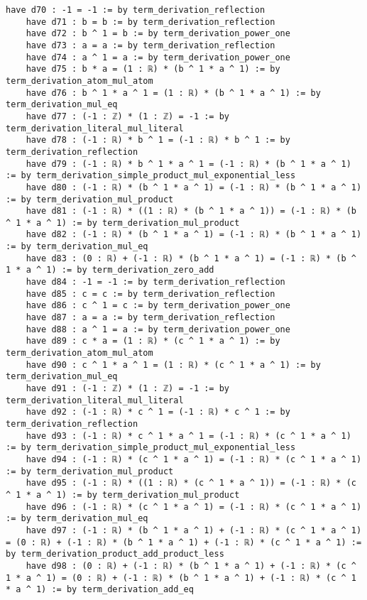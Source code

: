 \documentclass{article}
\begin{document}
\begin{tcolorbox}[colback=white!10, width=\linewidth]
\begin{lstlisting}[language=Lean4]
    have d70 : -1 = -1 := by term_derivation_reflection
    have d71 : b = b := by term_derivation_reflection
    have d72 : b ^ 1 = b := by term_derivation_power_one
    have d73 : a = a := by term_derivation_reflection
    have d74 : a ^ 1 = a := by term_derivation_power_one
    have d75 : b * a = (1 : ℝ) * (b ^ 1 * a ^ 1) := by term_derivation_atom_mul_atom
    have d76 : b ^ 1 * a ^ 1 = (1 : ℝ) * (b ^ 1 * a ^ 1) := by term_derivation_mul_eq
    have d77 : (-1 : ℤ) * (1 : ℤ) = -1 := by term_derivation_literal_mul_literal
    have d78 : (-1 : ℝ) * b ^ 1 = (-1 : ℝ) * b ^ 1 := by term_derivation_reflection
    have d79 : (-1 : ℝ) * b ^ 1 * a ^ 1 = (-1 : ℝ) * (b ^ 1 * a ^ 1) := by term_derivation_simple_product_mul_exponential_less
    have d80 : (-1 : ℝ) * (b ^ 1 * a ^ 1) = (-1 : ℝ) * (b ^ 1 * a ^ 1) := by term_derivation_mul_product
    have d81 : (-1 : ℝ) * ((1 : ℝ) * (b ^ 1 * a ^ 1)) = (-1 : ℝ) * (b ^ 1 * a ^ 1) := by term_derivation_mul_product
    have d82 : (-1 : ℝ) * (b ^ 1 * a ^ 1) = (-1 : ℝ) * (b ^ 1 * a ^ 1) := by term_derivation_mul_eq
    have d83 : (0 : ℝ) + (-1 : ℝ) * (b ^ 1 * a ^ 1) = (-1 : ℝ) * (b ^ 1 * a ^ 1) := by term_derivation_zero_add
    have d84 : -1 = -1 := by term_derivation_reflection
    have d85 : c = c := by term_derivation_reflection
    have d86 : c ^ 1 = c := by term_derivation_power_one
    have d87 : a = a := by term_derivation_reflection
    have d88 : a ^ 1 = a := by term_derivation_power_one
    have d89 : c * a = (1 : ℝ) * (c ^ 1 * a ^ 1) := by term_derivation_atom_mul_atom
    have d90 : c ^ 1 * a ^ 1 = (1 : ℝ) * (c ^ 1 * a ^ 1) := by term_derivation_mul_eq
    have d91 : (-1 : ℤ) * (1 : ℤ) = -1 := by term_derivation_literal_mul_literal
    have d92 : (-1 : ℝ) * c ^ 1 = (-1 : ℝ) * c ^ 1 := by term_derivation_reflection
    have d93 : (-1 : ℝ) * c ^ 1 * a ^ 1 = (-1 : ℝ) * (c ^ 1 * a ^ 1) := by term_derivation_simple_product_mul_exponential_less
    have d94 : (-1 : ℝ) * (c ^ 1 * a ^ 1) = (-1 : ℝ) * (c ^ 1 * a ^ 1) := by term_derivation_mul_product
    have d95 : (-1 : ℝ) * ((1 : ℝ) * (c ^ 1 * a ^ 1)) = (-1 : ℝ) * (c ^ 1 * a ^ 1) := by term_derivation_mul_product
    have d96 : (-1 : ℝ) * (c ^ 1 * a ^ 1) = (-1 : ℝ) * (c ^ 1 * a ^ 1) := by term_derivation_mul_eq
    have d97 : (-1 : ℝ) * (b ^ 1 * a ^ 1) + (-1 : ℝ) * (c ^ 1 * a ^ 1) = (0 : ℝ) + (-1 : ℝ) * (b ^ 1 * a ^ 1) + (-1 : ℝ) * (c ^ 1 * a ^ 1) := by term_derivation_product_add_product_less
    have d98 : (0 : ℝ) + (-1 : ℝ) * (b ^ 1 * a ^ 1) + (-1 : ℝ) * (c ^ 1 * a ^ 1) = (0 : ℝ) + (-1 : ℝ) * (b ^ 1 * a ^ 1) + (-1 : ℝ) * (c ^ 1 * a ^ 1) := by term_derivation_add_eq

\end{lstlisting}
\end{tcolorbox}
\end{document}

